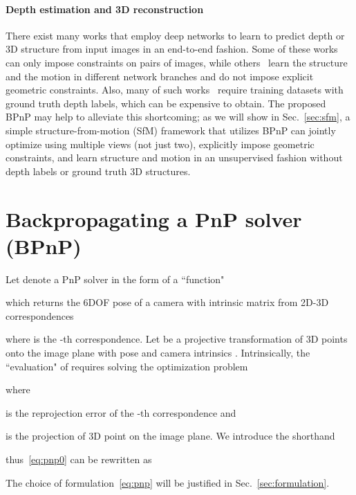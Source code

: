 \documentclass[10pt,twocolumn,letterpaper]{article}
\begin{document}
\paragraph{Depth estimation and 3D reconstruction} There exist many works that employ deep networks to learn to predict depth or 3D structure from input images in an end-to-end fashion. Some of these works~\cite{Handa2016gvnn, Clark2018learning, Kendall2017end} can only impose constraints on pairs of images, while others~\cite{Zhou2017unsupervised, Ummenhofer2017demon} learn the structure and the motion in different network branches and do not impose explicit geometric constraints. Also, many of such works~\cite{Eigen2014depth, Ladicky2014pulling, Liu2016learning, Liu2015deep, Laina2016deeper, Xu2017multi, Wang2015towards} require training datasets with ground truth depth labels, which can be expensive to obtain. The proposed BPnP may help to alleviate this shortcoming; as we will show in Sec.~\ref{sec:sfm}, a simple structure-from-motion (SfM) framework that utilizes BPnP can jointly optimize using multiple views (not just two), explicitly impose geometric constraints, and learn structure and motion in an unsupervised fashion without depth labels or ground truth 3D structures.






\section{Backpropagating a PnP solver (BPnP)}\label{sec:bpnp}

Let  denote a PnP solver in the form of a ``function"

which returns the 6DOF pose  of a camera with intrinsic matrix  from  2D-3D correspondences

where  is the -th correspondence. Let  be a projective transformation of 3D points onto the image plane with pose  and camera intrinsics . Intrinsically, the ``evaluation" of  requires solving the optimization problem

where 

is the reprojection error of the -th correspondence and

is the projection of 3D point  on the image plane. We introduce the shorthand

thus~\eqref{eq:pnp0} can be rewritten as

The choice of formulation~\eqref{eq:pnp} will be justified in Sec.~\ref{sec:formulation}.
\end{document}
